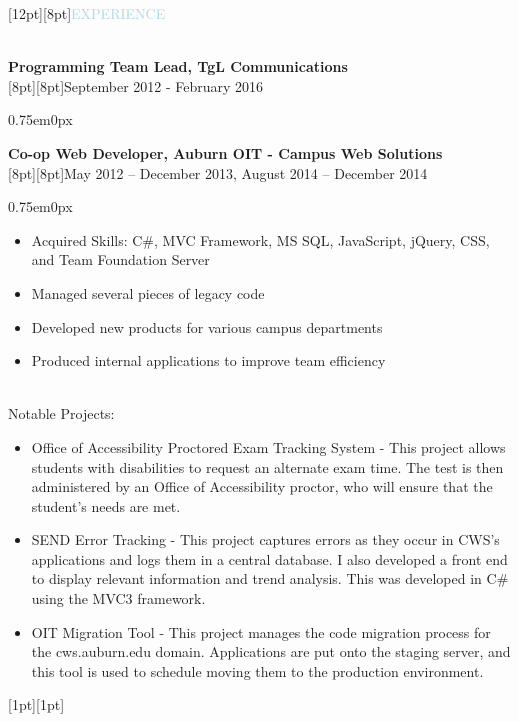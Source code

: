 \documentclass{res}
\newenvironment{ResumeBlock}[1]
{
	\begin{normalsize}
		\raisebox{0pt}[12pt][8pt]{\textcolor{lightblue}{#1}}
	\end{normalsize}
	\\
}
{	
}
\newenvironment{DetailsBlock}[2]
{
	\textbf{\color{darkfont}#1}
	\\
	\raisebox{0pt}[8pt][8pt]{#2}
	\begin{adjustwidth}{0.75em}{0px}
}
{	
	\end{adjustwidth}
}
\begin{document}
\begin{ResumeBlock}{EXPERIENCE}
\begin{DetailsBlock}{Programming Team Lead, TgL Communications}{September 2012 - February 2016}
\begin{itemize}
			\end{itemize}
		\end{DetailsBlock}		
		\begin{DetailsBlock}{Co-op Web Developer, Auburn OIT - Campus Web Solutions}{May 2012 – December 2013, August 2014 – December 2014 }
			\begin{itemize}
				\item Acquired Skills:  C\#, MVC Framework, MS SQL, JavaScript, jQuery, CSS, and Team Foundation Server 
				\item Managed several pieces of legacy code
				\item Developed new products for various campus departments 
				\item Produced internal applications to improve team efficiency 
			\end{itemize}
			~\\
			Notable Projects:
			\begin{itemize}
				\item Office of Accessibility Proctored Exam Tracking System - This project allows students with disabilities to request an alternate exam time.  The test is then administered by an Office of Accessibility proctor, who will ensure that the student’s needs are met.   
				\item SEND Error Tracking - This project captures errors as they occur in CWS's applications and logs them in a central database.  I also developed a front end to display relevant information and trend analysis.  This was developed in C\# using the MVC3 framework. 
				\item OIT Migration Tool - This project manages the code migration process for the cws.auburn.edu domain.  Applications are put onto the staging server, and this tool is used to schedule moving them to the production environment. 
			\end{itemize}
			\raisebox{0pt}[1pt][1pt]{\space}
		\end{DetailsBlock}
	\end{ResumeBlock}	
	\\\hline
\end{document}
